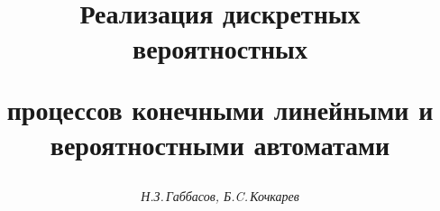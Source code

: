 




%





\newcommand{\la}{\langle}


\newcommand{\ra}{\rangle}


\newcommand{\tts}[1]{}










\setcounter{page}{3}

















\author{\it Н.З.\,Габбасов, Б.C.\,Кочкарев}




\title{Реализация дискретных вероятностных


процессов конечными линейными и вероятностными автоматами}





\date{}




\pagestyle{plain} %







\maketitle


